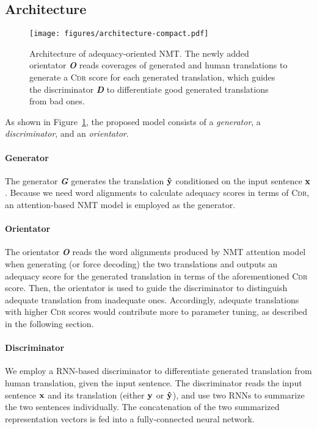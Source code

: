 \documentclass[letterpaper]{article} \usepackage{aaai19}  \usepackage{times}  \usepackage{helvet}  \usepackage{courier}  \usepackage{url}  \usepackage{graphicx}  \frenchspacing  \setlength{\pdfpagewidth}{8.5in}  \setlength{\pdfpageheight}{11in}  \usepackage{amsmath}
\begin{document}
\subsection{\textbf{Architecture}}

\begin{figure}[t]
 \centering
 \texttt{[image: figures/architecture-compact.pdf]}
 \caption{Architecture of adequacy-oriented NMT. The newly added orientator {\bf \em O} reads coverages of generated and human translations to generate  a \textsc{Cdr} score for each generated translation, which guides the discriminator {\bf \em D} to differentiate good generated translations from bad ones.}
 \label{figure-architecture}
 
\end{figure}


As shown in Figure~\ref{figure-architecture}, the proposed model consists of a {\em generator}, a {\em discriminator}, and an {\em orientator}.

\paragraph{Generator} The generator {\bf \em G} generates the translation ${\bf \hat{y}}$ conditioned on the input sentence ${\bf x}$. Because we need word alignments to calculate adequacy  scores in terms of \textsc{Cdr}, an attention-based NMT model is employed as the generator.


\paragraph{Orientator} The orientator {\bf \em O} reads the word alignments produced by NMT attention model when generating (or force decoding) the two translations and outputs an adequacy score for the generated translation in terms of the aforementioned \textsc{Cdr} score. Then, the orientator is used to guide the discriminator to distinguish adequate translation from inadequate ones. Accordingly, adequate translations with higher \textsc{Cdr} scores would contribute more to parameter tuning, as described in the following section.

\paragraph{Discriminator} We employ a RNN-based discriminator to differentiate generated translation from human translation, given the input sentence. The discriminator reads the input sentence ${\bf x}$ and its translation (either ${\bf y}$ or ${\bf \hat{y}}$), and use two RNNs to summarize the two sentences individually. The concatenation of the two summarized representation vectors is fed into a fully-connected neural network.
\end{document}
